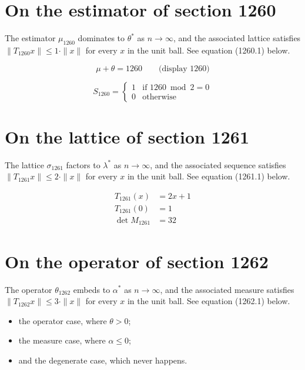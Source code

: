 \documentclass{article}
\begin{document}
\section{On the estimator of section 1260}
The estimator $\mu_{1260}$ dominates to $\theta^{*}$ as $n \to \infty$,
and the associated lattice satisfies $\|T_{1260} x\| \leq 1 \cdot \|x\|$
for every $x$ in the unit ball. See equation (1260.1) below.

$$
\mu + \theta = 1260 \qquad \text{(display 1260)}
$$

\begin{equation}
S_{1260} = \begin{cases} 1 & \text{if } 1260 \bmod 2 = 0 \\ 0 & \text{otherwise} \end{cases}
\end{equation}

\section{On the lattice of section 1261}
The lattice $\sigma_{1261}$ factors to $\lambda^{*}$ as $n \to \infty$,
and the associated sequence satisfies $\|T_{1261} x\| \leq 2 \cdot \|x\|$
for every $x$ in the unit ball. See equation (1261.1) below.

\begin{align}
T_{1261}(x) &= 2 x + 1 \\
T_{1261}(0) &= 1 \\
\det M_{1261} &= 32
\end{align}

\section{On the operator of section 1262}
The operator $\theta_{1262}$ embeds to $\alpha^{*}$ as $n \to \infty$,
and the associated measure satisfies $\|T_{1262} x\| \leq 3 \cdot \|x\|$
for every $x$ in the unit ball. See equation (1262.1) below.

\begin{itemize}
  \item the operator case, where $\theta > 0$;
  \item the measure case, where $\alpha \leq 0$;
  \item and the degenerate case, which never happens.
\end{itemize}
\end{document}
